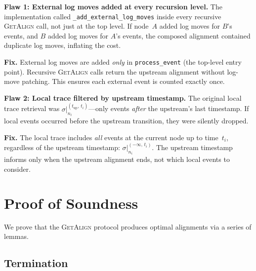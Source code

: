 \documentclass[11pt,a4paper]{article}
\newcommand{\trace}{\sigma}
\newcommand{\GA}{\textsc{GetAlign}}
\begin{document}
\begin{oldbox}
\textbf{Flaw 1: External log moves added at every recursion level.}\;
The implementation called \texttt{\_add\_external\_log\_moves}
inside every recursive \GA{} call, not just at the top level.  If
node~$A$ added log moves for $B$'s events, and $B$ added log moves
for $A$'s events, the composed alignment contained duplicate log moves,
inflating the cost.
\end{oldbox}

\begin{newboxelem}
\textbf{Fix.}\;
External log moves are added \emph{only} in \texttt{process\_event}
(the top-level entry point).  Recursive \GA{} calls return the
upstream alignment without log-move patching.
This ensures each external event is counted exactly once.
\end{newboxelem}

\begin{oldbox}
\textbf{Flaw 2: Local trace filtered by upstream timestamp.}\;
The original local trace retrieval was
$\trace|_{n_i}^{(t_{\mathrm{up}},\, t_i)}$—only events
\emph{after} the upstream's last timestamp.  If local events occurred
before the upstream transition, they were silently dropped.
\end{oldbox}

\begin{newboxelem}
\textbf{Fix.}\;
The local trace includes \emph{all} events at the current node up to
time~$t_i$, regardless of the upstream timestamp:
$\trace|_{n_i}^{(-\infty,\, t_i)}$.
The upstream timestamp informs only when the upstream alignment ends,
not which local events to consider.
\end{newboxelem}


\section{Proof of Soundness}
\label{sec:proof}

We prove that the \GA{} protocol produces optimal alignments
via a series of lemmas.

\subsection{Termination}
\end{document}
